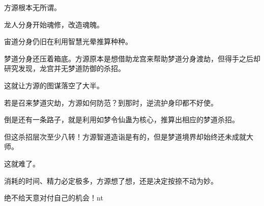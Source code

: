 \begin{this_body}
方源根本无所谓。

龙人分身开始魂修，改造魂魄。

宙道分身仍旧在利用智慧光晕推算种种。

梦道分身还压着箱底。方源原本是想借助龙宫来帮助梦道分身渡劫，但得手之后却研究发现，龙宫并无梦道防御的杀招。

这就让方源的图谋落空了大半。

若是召来梦道灾劫，方源如何防范？到那时，逆流护身印都不好使。

倒是还有一条路子，就是利用如梦令仙蛊为核心，推算出相应的梦道杀招。

但这杀招层次至少八转！方源智道造诣是有的，但是梦道境界却始终还未成就大师。

这就难了。

消耗的时间、精力必定极多，方源想了想，还是决定按捺不动为妙。

绝不给天意对付自己的机会！nt

\end{this_body}

